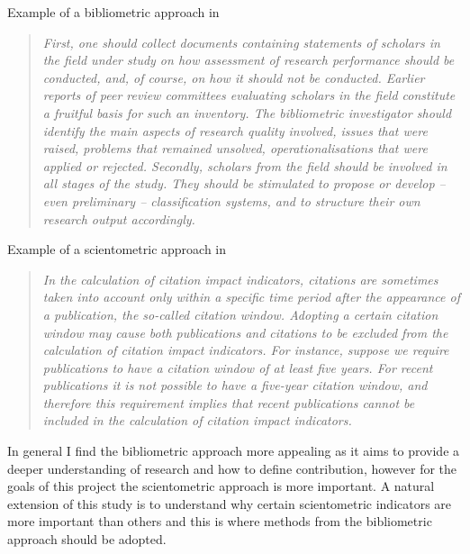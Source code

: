 \documentclass[10pt]{report}
\begin{document}
Example of a bibliometric approach in \textcite[p. 151]{Moed2006}
\begin{quote}
\textit{First, one should collect documents containing statements
of scholars in the field under study on how assessment of research
performance should be conducted, and, of course, on how it should not be
conducted. Earlier reports of peer review committees evaluating scholars in
the field constitute a fruitful basis for such an inventory. The bibliometric
investigator should identify the main aspects of research quality involved,
issues that were raised, problems that remained unsolved, operationalisations
that were applied or rejected. Secondly, scholars from the field should be
involved in all stages of the study. They should be stimulated to propose or
develop – even preliminary – classification systems, and to structure their
own research output accordingly.}

\end{quote}

\vspace{10pt}

Example of a scientometric approach in \textcite[p. 20]{Waltman2016}

\begin{quote}
\textit{In the calculation of citation impact indicators, citations are sometimes taken into
account only within a specific time period after the appearance of a publication, the
so-called citation window. Adopting a certain citation window may cause both
publications and citations to be excluded from the calculation of citation impact
indicators. For instance, suppose we require publications to have a citation window of
at least five years. For recent publications it is not possible to have a five-year citation
window, and therefore this requirement implies that recent publications cannot be
included in the calculation of citation impact indicators.}

\end{quote}


In general I find the bibliometric approach more appealing as it aims to provide a deeper understanding of research and how to define contribution, however for the goals of this project the scientometric approach is more important. A natural extension of this study is to understand why certain scientometric indicators are more important than others and this is where methods from the bibliometric approach should be adopted.
\end{document}
